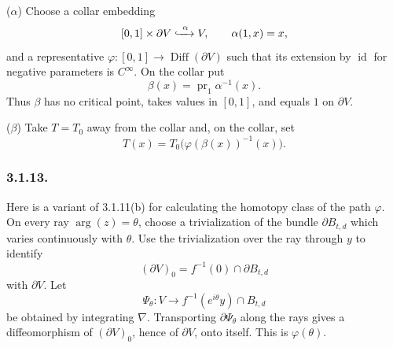\medskip
\noindent\textup{($\alpha$)} Choose a collar embedding
  \[
  [0,1]\times\partial V\xhookrightarrow{\ \alpha\ }V,
  \qquad \alpha(1,x)=x,
  \]
  and a representative
  $\varphi:[0,1]\to\operatorname{Diff}(\partial V)$ such that its
  extension by $\operatorname{id}$ for negative parameters is
  $C^\infty$.  On the collar put
  \[
  \beta(x)=\operatorname{pr}_1\alpha^{-1}(x).
  \]
  Thus $\beta$ has no critical point, takes values in $[0,1]$, and
  equals $1$ on $\partial V$.

\medskip
\noindent\textup{($\beta$)} Take $T=T_0$ away from the collar and, on the collar, set
  \[
  T(x)=T_0\bigl(\varphi(\beta(x))^{-1}(x)\bigr).
  \]

\subsubsection*{3.1.13.}
Here is a variant of 3.1.11(b) for calculating the homotopy class of
the path $\varphi$.  On every ray $\arg(z)=\theta$, choose a
trivialization of the bundle $\partial B_{t,d}$ which varies
continuously with $\theta$.  Use the trivialization over the ray
through $y$ to identify
\[
(\partial V)_0=f^{-1}(0)\cap\partial B_{t,d}
\]
with $\partial V$.  Let
\[
\Psi_\theta:V\longrightarrow
f^{-1}(e^{i\theta}y)\cap B_{t,d}
\]
be obtained by integrating $\nabla$.  Transporting
$\partial\Psi_\theta$ along the rays gives a diffeomorphism of
$(\partial V)_0$, hence of $\partial V$, onto itself.  This is
$\varphi(\theta)$.
